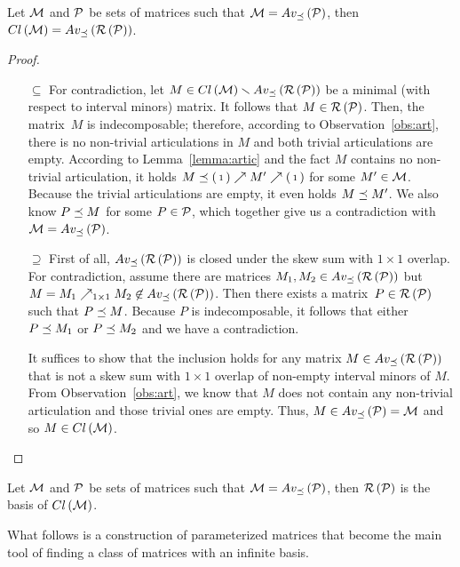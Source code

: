 \begin{thm}
\label{thm:basis}
Let $\mathcal{M}$ and $\mathcal{P}$ be sets of matrices such that $\mathcal{M}=Av_{\preceq}\left(\mathcal{P}\right)$, then $Cl\left(\mathcal{M}\right)=Av_{\preceq}\left(\mathcal{R}\left(\mathcal{P}\right)\right)$.
\end{thm}
\begin{proof}
\begin{itemize}
	\item[$\subseteq$] For contradiction, let $M\in Cl\left(\mathcal{M}\right)\smallsetminus Av_{\preceq}\left(\mathcal{R}\left(\mathcal{P}\right)\right)$ be a minimal (with respect to interval minors) matrix. It follows that $M\in\mathcal{R}\left(\mathcal{P}\right)$. Then, the matrix~$M$ is indecomposable; therefore, according to Observation~\ref{obs:art}, there is no non-trivial articulations in $M$ and both trivial articulations are empty. According to Lemma~\ref{lemma:artic} and the fact $M$ contains no non-trivial articulation, it holds $M\preceq\left(\begin{smallmatrix}1\end{smallmatrix}\right)\nearrow M'\nearrow\left(\begin{smallmatrix}1\end{smallmatrix}\right)$ for some $M'\in\mathcal{M}$. Because the trivial articulations are empty, it even holds $M\preceq M'$. We also know $P\preceq M$ for some $P\in\mathcal{P}$, which together give us a contradiction with $\mathcal{M}=Av_{\preceq}\left(\mathcal{P}\right)$.
	\item[$\supseteq$] First of all, $Av_{\preceq}\left(\mathcal{R}\left(\mathcal{P}\right)\right)$ is closed under the skew sum with $1\times1$ overlap. For contradiction, assume there are matrices $M_1,M_2\in Av_{\preceq}\left(\mathcal{R}\left(\mathcal{P}\right)\right)$ but $M=M_1\nearrow_{1\times1}M_2\not\in Av_{\preceq}\left(\mathcal{R}\left(\mathcal{P}\right)\right)$. Then there exists a matrix~$P\in\mathcal{R}\left(\mathcal{P}\right)$ such that $P\preceq M$. Because $P$ is indecomposable, it follows that either $P\preceq M_1$ or $P\preceq M_2$ and we have a contradiction.

It suffices to show that the inclusion holds for any matrix $M\in Av_{\preceq}\left(\mathcal{R}\left(\mathcal{P}\right)\right)$ that is not a skew sum with $1\times1$ overlap of non-empty interval minors of $M$. From Observation~\ref{obs:art}, we know that $M$ does not contain any non-trivial articulation and those trivial ones are empty. Thus, $M\in Av_{\preceq}\left(\mathcal{P}\right)=\mathcal{M}$ and so $M\in Cl\left(\mathcal{M}\right)$. \qedhere
\end{itemize}
\end{proof}

\begin{cor}
Let $\mathcal{M}$ and $\mathcal{P}$ be sets of matrices such that $\mathcal{M}=Av_{\preceq}\left(\mathcal{P}\right)$, then $\mathcal{R}\left(\mathcal{P}\right)$ is the basis of $Cl\left(\mathcal{M}\right)$.
\end{cor}

What follows is a construction of parameterized matrices that become the main tool of finding a class of matrices with an infinite basis.


